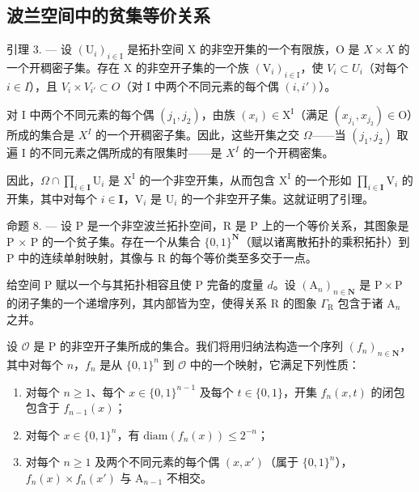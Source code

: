 \subsection{波兰空间中的贫集等价关系}

引理 3. --- 设 \((\mathrm{U}_{i})_{i\in\mathrm{I}}\) 是拓扑空间 X 的非空开集的一个有限族，O 是 \(X\times X\) 的一个开稠密子集。存在 X 的非空开子集的一个族 \((\mathrm{V}_{i})_{i\in\mathrm{I}}\)，使 \(V_{i}\subset U_{i}\)（对每个 \(i\in I\)），且 \(V_{i}\times V_{i'}\subset O\)（对 I 中两个不同元素的每个偶 \((i,i')\)）。

对 I 中两个不同元素的每个偶 \((j_{1}, j_{2})\)，由族 \((x_{i}) \in \mathrm{X}^{\mathrm{I}}\)（满足 \((x_{j_{1}}, x_{j_{2}}) \in \mathrm{O}\)）所成的集合是 \(X^{I}\) 的一个开稠密子集。因此，这些开集之交 \(\Omega\)——当 \((j_{1}, j_{2})\) 取遍 I 的不同元素之偶所成的有限集时——是 \(X^{I}\) 的一个开稠密集。

因此，\(\Omega \cap \prod_{i\in \mathbf{I}}\mathrm{U}_i\) 是 \(\mathrm{X}^{\mathrm{I}}\) 的一个非空开集，从而包含 \(\mathrm{X}^{\mathrm{I}}\) 的一个形如 \(\prod_{i\in \mathbf{I}}\mathrm{V}_i\) 的开集，其中对每个 \(i\in \mathbf{I}\)，\(\mathrm{V}_i\) 是 \(\mathrm{U}_i\) 的一个非空开子集。这就证明了引理。

命题 8. --- 设 P 是一个非空波兰拓扑空间，R 是 P 上的一个等价关系，其图象是 P × P 的一个贫子集。存在一个从集合 \(\{0,1\}^{\mathbf{N}}\)（赋以诸离散拓扑的乘积拓扑）到 P 中的连续单射映射，其像与 R 的每个等价类至多交于一点。

给空间 P 赋以一个与其拓扑相容且使 P 完备的度量 \(d\)。设 \((\mathrm{A}_n)_{n\in \mathbf{N}}\) 是 \(\mathrm{P}\times \mathrm{P}\) 的闭子集的一个递增序列，其内部皆为空，使得关系 R 的图象 \(\Gamma_{\mathrm{R}}\) 包含于诸 \(\mathrm{A}_n\) 之并。

设 \(\mathcal{O}\) 是 P 的非空开子集所成的集合。我们将用归纳法构造一个序列 \((f_n)_{n \in \mathbf{N}}\)，其中对每个 \(n\)，\(f_n\) 是从 \(\{0,1\}^n\) 到 \(\mathcal{O}\) 中的一个映射，它满足下列性质：

\begin{enumerate}
\def\labelenumi{(\roman{enumi})}
\item
  对每个 \(n \geqslant 1\)、每个 \(x \in \{0,1\}^{n-1}\) 及每个 \(t \in \{0,1\}\)，开集 \(f_n(x,t)\) 的闭包包含于 \(f_{n-1}(x)\)；
\item
  对每个 \(x \in \{0,1\}^n\)，有 \(\mathrm{diam}(f_n(x)) \leqslant 2^{-n}\)；
\item
  对每个 \(n \geqslant 1\) 及两个不同元素的每个偶 \((x, x')\)（属于 \(\{0, 1\}^n\)），\(f_n(x) \times f_n(x')\) 与 \(\mathrm{A}_{n-1}\) 不相交。
\end{enumerate}

